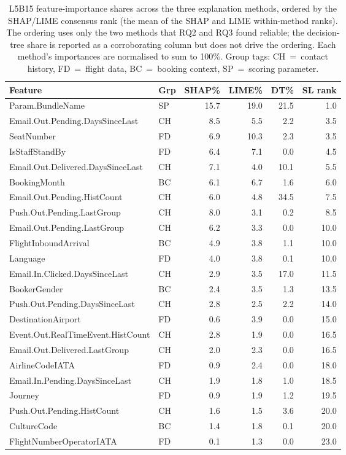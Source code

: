 \begin{table}[ht]
\caption{L5B15 feature-importance shares across the three explanation methods, ordered by the SHAP/LIME consensus rank (the mean of the SHAP and LIME within-method ranks). The ordering uses only the two methods that RQ2 and RQ3 found reliable; the decision-tree share is reported as a corroborating column but does not drive the ordering. Each method's importances are normalised to sum to 100\%. Group tags: CH~=~contact history, FD~=~flight data, BC~=~booking context, SP~=~scoring parameter.}
\label{tab:rq5_feature_importance}
\centering
\small
\begin{tabular}{llrrrr}
\toprule
Feature & Grp & SHAP\% & LIME\% & DT\% & SL rank \\
\midrule
Param.BundleName & SP & 15.7 & 19.0 & 21.5 & 1.0 \\
Email.Out.Pending.DaysSinceLast & CH & 8.5 & 5.5 & 2.2 & 3.5 \\
SeatNumber & FD & 6.9 & 10.3 & 2.3 & 3.5 \\
IsStaffStandBy & FD & 6.4 & 7.1 & 0.0 & 4.5 \\
Email.Out.Delivered.DaysSinceLast & CH & 7.1 & 4.0 & 10.1 & 5.5 \\
BookingMonth & BC & 6.1 & 6.7 & 1.6 & 6.0 \\
Email.Out.Pending.HistCount & CH & 6.0 & 4.8 & 34.5 & 7.5 \\
Push.Out.Pending.LastGroup & CH & 8.0 & 3.1 & 0.2 & 8.5 \\
Email.Out.Pending.LastGroup & CH & 6.2 & 3.3 & 0.0 & 10.0 \\
FlightInboundArrival & BC & 4.9 & 3.8 & 1.1 & 10.0 \\
Language & FD & 4.0 & 3.8 & 0.1 & 10.0 \\
Email.In.Clicked.DaysSinceLast & CH & 2.9 & 3.5 & 17.0 & 11.5 \\
BookerGender & BC & 2.4 & 3.5 & 1.3 & 13.5 \\
Push.Out.Pending.DaysSinceLast & CH & 2.8 & 2.5 & 2.2 & 14.0 \\
DestinationAirport & FD & 0.6 & 3.9 & 0.0 & 15.0 \\
Event.Out.RealTimeEvent.HistCount & CH & 2.8 & 1.9 & 0.0 & 16.5 \\
Email.Out.Delivered.LastGroup & CH & 2.0 & 2.3 & 0.0 & 16.5 \\
AirlineCodeIATA & FD & 0.9 & 2.4 & 0.0 & 18.0 \\
Email.In.Pending.DaysSinceLast & CH & 1.9 & 1.8 & 1.0 & 18.5 \\
Journey & FD & 0.9 & 1.9 & 1.2 & 19.5 \\
Push.Out.Pending.HistCount & CH & 1.6 & 1.5 & 3.6 & 20.0 \\
CultureCode & BC & 1.4 & 1.8 & 0.1 & 20.0 \\
FlightNumberOperatorIATA & FD & 0.1 & 1.3 & 0.0 & 23.0 \\
\bottomrule
\end{tabular}
\end{table}
